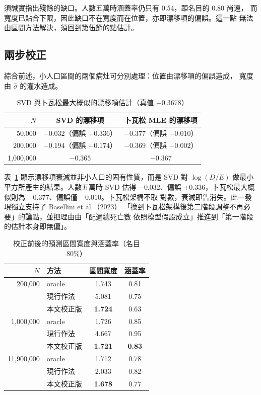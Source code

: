 \documentclass[UTF8, fontset=macnew, a4paper, 12pt]{ctexart}
\begin{document}
須誠實指出殘餘的缺口。人數五萬時涵蓋率仍只有 0.54，距名目的 0.80 尚遠，
而寬度已貼合下限，因此缺口不在寬度而在位置，亦即漂移項的偏誤。這一點
無法由區間方法解決，須回到第伍節的點估計。

\subsection{兩步校正}

綜合前述，小人口區間的兩個病灶可分別處理：位置由漂移項的偏誤造成，
寬度由 $\hat\sigma$ 的灌水造成。

\begin{table}[H]
\centering
\caption{SVD 與卜瓦松最大概似的漂移項估計（真值 $-0.3678$）}
\small
\begin{tabular}{rcc}
\toprule
$N$ & SVD 的漂移項 & 卜瓦松 MLE 的漂移項\\
\midrule
50,000    & $-0.032$（偏誤 $+0.336$） & $\mathbf{-0.377}$（偏誤 $-0.010$）\\
200,000   & $-0.194$（偏誤 $+0.174$） & $\mathbf{-0.369}$（偏誤 $-0.002$）\\
1,000,000 & $-0.365$ & $-0.367$\\
\bottomrule
\end{tabular}
\label{tab:drift}
\end{table}

表~\ref{tab:drift} 顯示漂移項衰減並非小人口的固有性質，而是 SVD 對
$\log(D/E)$ 做最小平方所產生的結果。人數五萬時 SVD 估得 $-0.032$、偏誤
$+0.336$，卜瓦松最大概似則為 $-0.377$、偏誤僅 $-0.010$。卜瓦松架構不取
對數，衰減即告消失。此一發現獨立支持了 Basellini et al.（2023）
「換到卜瓦松架構後第二階段調整不再必要」的論點，並把理由由「配適總死亡數
依照模型假設成立」推進到「第一階段的估計本身即無偏」。

\begin{table}[H]
\centering
\caption{校正前後的預測區間寬度與涵蓋率（名目 80\%）}
\small
\begin{tabular}{rlcc}
\toprule
$N$ & 方法 & 區間寬度 & 涵蓋率\\
\midrule
200,000 & oracle & 1.743 & 0.81\\
        & 現行作法 & 5.081 & 0.75\\
        & 本文校正版 & \textbf{1.724} & 0.63\\
\midrule
1,000,000 & oracle & 1.726 & 0.85\\
          & 現行作法 & 4.667 & 0.95\\
          & 本文校正版 & \textbf{1.721} & \textbf{0.83}\\
\midrule
11,900,000 & oracle & 1.712 & 0.78\\
           & 現行作法 & 2.033 & 0.82\\
           & 本文校正版 & \textbf{1.678} & 0.77\\
\bottomrule
\end{tabular}
\label{tab:calib}
\end{table}
\end{document}
